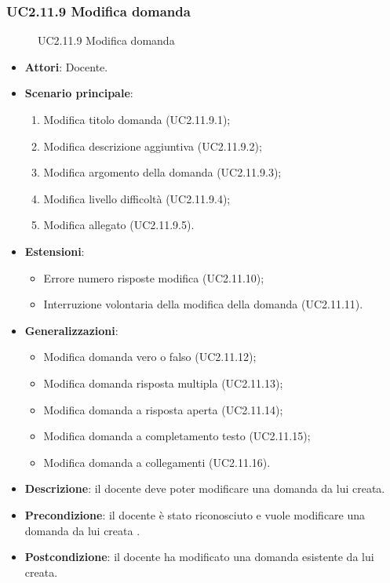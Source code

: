\subsubsection{UC2.11.9 Modifica domanda}
\begin{figure}[H]
\centering
\noindent{}
\caption{UC2.11.9 Modifica domanda}
\end{figure}
\begin{itemize}
\item \textbf{Attori}: Docente.
\item \textbf{Scenario principale}:
\begin{enumerate}
\item Modifica titolo domanda
 (UC2.11.9.1);
\item Modifica descrizione aggiuntiva (UC2.11.9.2);
\item Modifica argomento della domanda (UC2.11.9.3);
\item Modifica livello difficoltà (UC2.11.9.4);
\item Modifica allegato (UC2.11.9.5).
\end{enumerate}
\item \textbf{Estensioni}:
\begin{itemize}
\item Errore numero risposte modifica (UC2.11.10);
\item Interruzione volontaria della modifica della domanda (UC2.11.11).
\end{itemize}
\item \textbf{Generalizzazioni}:
\begin{itemize}
\item Modifica domanda vero o falso (UC2.11.12);
\item Modifica domanda risposta multipla (UC2.11.13);
\item Modifica domanda a risposta aperta (UC2.11.14);
\item Modifica domanda a completamento testo (UC2.11.15);
\item Modifica domanda a collegamenti (UC2.11.16).
\end{itemize}
\item \textbf{Descrizione}: il docente deve poter modificare una domanda da lui creata.
\item \textbf{Precondizione}: il docente è stato riconosciuto e vuole modificare una domanda da lui creata
.
\item \textbf{Postcondizione}: il docente ha modificato una domanda esistente da lui creata.
\end{itemize}

